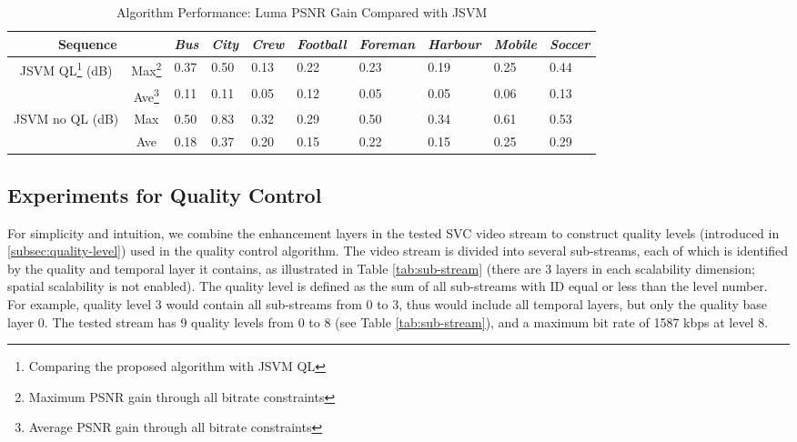 \documentclass[journal]{IEEEtran}
\begin{document}
\begin{table}[t]
\centering
\caption{Algorithm Performance: Luma PSNR Gain Compared with JSVM}
\label{tab:results}
\begin{minipage}{0.95\linewidth}
\centering
\begin{tabular}{c|c|p{1.2cm}<{\centering}|p{1.2cm}<{\centering}|p{1.2cm}<{\centering}|p{1.2cm}<{\centering}| 
p{1.2cm}<{\centering}|p{1.2cm}<{\centering}|p{1.2cm}<{\centering}|p{1.2cm}<{\centering}}
\hline \hline
\multicolumn{2}{c|}{Sequence} &
{\em Bus} & {\em City} & {\em Crew} & {\em Football} & {\em Foreman} & {\em Harbour} & {\em Mobile} & {\em Soccer} \\ \hline 
\multirow{2}{*}{JSVM QL\footnote{\label{footnote:JSVM_QL} Comparing the proposed algorithm with JSVM QL} (dB)}
& Max\footnote{\label{footnote:max} Maximum PSNR gain through all bitrate constraints} & 0.37 & 0.50 & 0.13 & 0.22 & 0.23 & 0.19 & 0.25 & 0.44 \\ \cline{2-10}
& Ave\footnote{\label{footnote:ave} Average PSNR gain through all bitrate constraints} & 0.11 & 0.11 & 0.05 & 0.12 & 0.05 & 0.05 & 0.06 & 0.13 \\ \hline
\multirow{2}{*}{JSVM no QL (dB)}
& Max & 0.50 & 0.83 & 0.32 & 0.29 & 0.50 & 0.34 & 0.61 & 0.53 \\ \cline{2-10}
& Ave & 0.18 & 0.37 & 0.20 & 0.15 & 0.22 & 0.15 & 0.25 & 0.29 \\ \hline
\end{tabular}
\end{minipage}
\end{table}

\subsection{Experiments for Quality Control}
\label{subsec:exp-control}

For simplicity and intuition, we combine the enhancement layers in the tested SVC video stream to construct quality levels (introduced in \ref{subsec:quality-level}) used in the quality control algorithm. The video stream is divided into several sub-streams, each of which is identified by the quality and temporal layer it contains, as illustrated in Table \ref{tab:sub-stream} (there are 3 layers in each scalability dimension; spatial scalability is not enabled). The quality level is defined as the sum of all sub-streams with ID equal or less than the level number. For example, quality level 3 would contain all sub-streams from 0 to 3, thus would include all temporal layers, but only the quality base layer 0. The tested stream has 9 quality levels from 0 to 8 (see Table \ref{tab:sub-stream}), and a maximum bit rate of 1587 kbps at level 8. 
\end{document}

